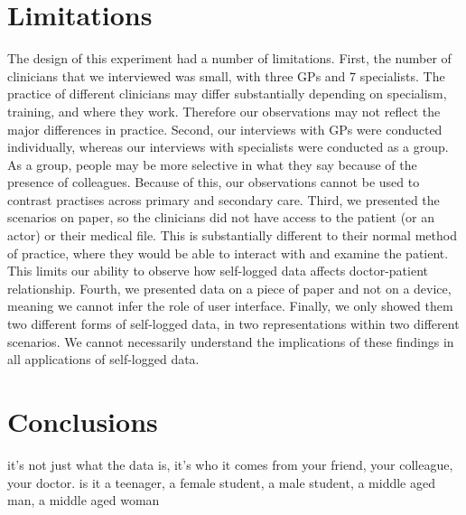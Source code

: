 \documentclass{sigchi}
\begin{document}



\section{Limitations}

The design of this experiment had a number of limitations. First, the number of clinicians that we interviewed was small, with three GPs and 7 specialists. The practice of different clinicians may differ substantially depending on specialism, training, and where they work. Therefore our observations may not reflect the major differences in practice. Second, our interviews with GPs were conducted individually, whereas our interviews with specialists were conducted as a group. As a group, people may be more selective in what they say because of the presence of colleagues. Because of this, our observations cannot be used to contrast practises across primary and secondary care. Third, we presented the scenarios on paper, so the clinicians did not have access to the patient (or an actor) or their medical file. This is substantially different to their normal method of practice, where they would be able to interact with and examine the patient. This limits our ability to observe how self-logged data affects doctor-patient relationship. Fourth, we presented data on a piece of paper and not on a device, meaning we cannot infer the role of user interface. Finally, we only showed them two different forms of self-logged data, in two representations within two different scenarios. We cannot necessarily understand the implications of these findings in all applications of self-logged data.


\section{Conclusions}




it's not just what the data is, it's who it comes from {your friend, your colleague, your doctor}. is it {a teenager, a female student, a male student, a middle aged man, a middle aged woman}




\end{document}
